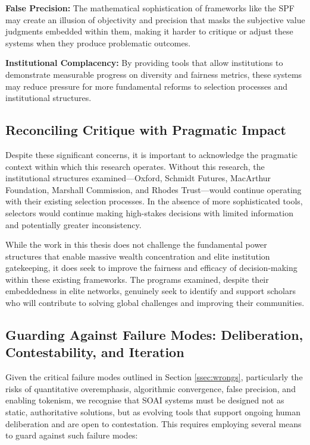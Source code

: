 \textbf{False Precision:} The mathematical sophistication of frameworks like the SPF may create an illusion of objectivity and precision that masks the subjective value judgments embedded within them, making it harder to critique or adjust these systems when they produce problematic outcomes.

\textbf{Institutional Complacency:} By providing tools that allow institutions to demonstrate measurable progress on diversity and fairness metrics, these systems may reduce pressure for more fundamental reforms to selection processes and institutional structures.

\subsection{Reconciling Critique with Pragmatic Impact}
Despite these significant concerns, it is important to acknowledge the pragmatic context within which this research operates. Without this research, the institutional structures examined—Oxford, Schmidt Futures, MacArthur Foundation, Marshall Commission, and Rhodes Trust—would continue operating with their existing selection processes. In the absence of more sophisticated tools, selectors would continue making high-stakes decisions with limited information and potentially greater inconsistency.

While the work in this thesis does not challenge the fundamental power structures that enable massive wealth concentration and elite institution gatekeeping, it does seek to improve the fairness and efficacy of decision-making within these existing frameworks. The programs examined, despite their embeddedness in elite networks, genuinely seek to identify and support scholars who will contribute to solving global challenges and improving their communities.

\subsection{Guarding Against Failure Modes: Deliberation, Contestability, and Iteration}\label{ssec:deliberation_contestability_iteration}
Given the critical failure modes outlined in Section \ref{ssec:wrongs}, particularly the risks of quantitative overemphasis, algorithmic convergence, false precision, and enabling tokenism, we recognise that SOAI systems must be designed not as static, authoritative solutions, but as evolving tools that support ongoing human deliberation and are open to contestation. This requires employing several means to guard against such failure modes:

